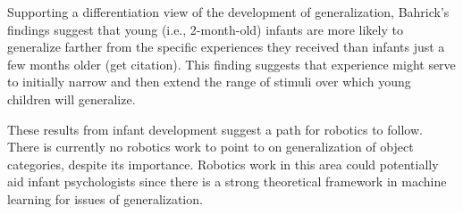 \ifverbose
Supporting a differentiation view of the development of
generalization, Bahrick's findings suggest that young (i.e.,
2-month-old) infants are more likely to generalize farther from the
specific experiences they received than infants just a few months
older (get citation).  This finding suggests that experience might
serve to initially narrow and then extend the range of stimuli over
which young children will generalize.
\fi

\ifverbose
These results from infant development suggest a path for robotics to
follow.  There is currently no robotics work to point to on
generalization of object categories, despite its importance.  Robotics
work in this area could potentially aid infant psychologists since
there is a strong theoretical framework in machine learning for issues
of generalization.
\fi



